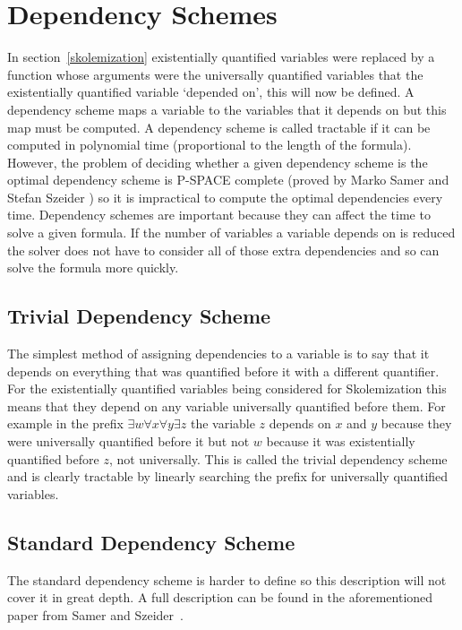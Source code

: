 \section{Dependency Schemes} \label{dependencyschemes}
In section~\ref{skolemization} existentially quantified variables were replaced by a function whose arguments were the universally quantified variables that the existentially quantified variable `depended on', this will now be defined. A dependency scheme maps a variable to the variables that it depends on but this map must be computed. A dependency scheme is called tractable if it can be computed in polynomial time (proportional to the length of the formula). However, the problem of deciding whether a given dependency scheme is the optimal dependency scheme is P-SPACE complete (proved by Marko Samer and Stefan Szeider \cite{samer2009backdoor}) so it is impractical to compute the optimal dependencies every time.
Dependency schemes are important because they can affect the time to solve a given formula. If the number of variables a variable depends on is reduced the solver does not have to consider all of those extra dependencies and so can solve the formula more quickly.

\subsection{Trivial Dependency Scheme}
The simplest method of assigning dependencies to a variable is to say that it depends on everything that was quantified before it with a different quantifier. For the existentially quantified variables being considered for Skolemization this means that they depend on any variable universally quantified before them. For example in the prefix $\exists w \forall x \forall y \exists z$ the variable $z$ depends on $x$ and $y$ because they were universally quantified before it but not $w$ because it was existentially quantified before $z$, not universally. This is called the trivial dependency scheme and is clearly tractable by linearly searching the prefix for universally quantified variables.

\subsection{Standard Dependency Scheme} \label{stddepscheme}
The standard dependency scheme is harder to define so this description will not cover it in great depth. A full description can be found in the aforementioned paper from Samer and Szeider~\cite{samer2009backdoor}.

